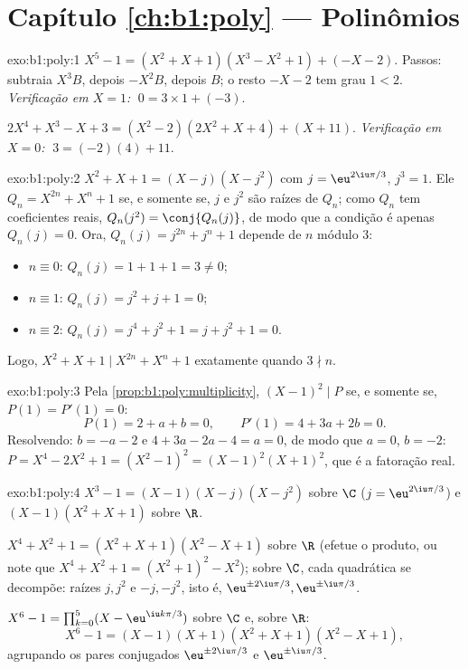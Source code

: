 \section*{Capítulo \ref{ch:b1:poly} --- Polinômios}

\begin{solution}{exo:b1:poly:1}
$X^5 - 1 = (X^2 + X + 1)(X^3 - X^2 + 1) + (-X - 2)$. Passos: subtraia
$X^3 B$, depois $-X^2 B$, depois $B$; o resto $-X - 2$ tem grau
$1 < 2$. \emph{Verificação em $X = 1$:} $\;0 = 3 \times 1 + (-3)$.

$2X^4 + X^3 - X + 3 = (X^2 - 2)(2X^2 + X + 4) + (X + 11)$. \emph{Verificação
em $X = 0$:} $\;3 = (-2)(4) + 11$.
\end{solution}

\begin{solution}{exo:b1:poly:2}
$X^2 + X + 1 = (X - j)(X - j^2)$ com $j = \eu^{2\iu\pi/3}$, $j^3 =
1$. Ele  $Q_n = X^{2n} + X^n + 1$ se, e somente se, $j$ e $j^2$ são raízes de
$Q_n$; como $Q_n$ tem coeficientes reais, $Q_n(j^2) =
\conj{Q_n(j)}$, de modo que a condição é apenas $Q_n(j) = 0$. Ora, $Q_n(j) =
j^{2n} + j^n + 1$ depende de $n$ módulo $3$:
\begin{itemize}
  \item $n \equiv 0$: $Q_n(j) = 1 + 1 + 1 = 3 \neq 0$;
  \item $n \equiv 1$: $Q_n(j) = j^2 + j + 1 = 0$;
  \item $n \equiv 2$: $Q_n(j) = j^4 + j^2 + 1 = j + j^2 + 1 = 0$.
\end{itemize}
Logo, $X^2 + X + 1 \mid X^{2n} + X^n + 1$ exatamente quando $3 \nmid n$.
\end{solution}

\begin{solution}{exo:b1:poly:3}
Pela \cref{prop:b1:poly:multiplicity}, $(X-1)^2 \mid P$ se, e somente se, $P(1) =
P'(1) = 0$:
\[
P(1) = 2 + a + b = 0, \qquad P'(1) = 4 + 3a + 2b = 0 .
\]
Resolvendo: $b = -a - 2$ e $4 + 3a - 2a - 4 = a = 0$, de modo que $a = 0$, $b =
-2$: $P = X^4 - 2X^2 + 1 = (X^2 - 1)^2 = (X-1)^2 (X+1)^2$, que é
a fatoração real.
\end{solution}

\begin{solution}{exo:b1:poly:4}
$X^3 - 1 = (X - 1)(X - j)(X - j^2)$ sobre $\C$ ($j = \eu^{2\iu\pi/3}$)
e $(X - 1)(X^2 + X + 1)$ sobre $\R$.

$X^4 + X^2 + 1 = (X^2 + X + 1)(X^2 - X + 1)$ sobre $\R$ (efetue o produto,
ou note que $X^4 + X^2 + 1 = (X^2+1)^2 - X^2$); sobre $\C$, cada quadrática
se decompõe: raízes $j, j^2$ e $-j, -j^2$, isto é, $\eu^{\pm 2\iu\pi/3},
\eu^{\pm\iu\pi/3}$.

$X^6 - 1 = \prod_{k=0}^{5} (X - \eu^{\iu k\pi/3})$ sobre $\C$ e, sobre
$\R$:
\[
X^6 - 1 = (X-1)(X+1)(X^2 + X + 1)(X^2 - X + 1),
\]
agrupando os pares conjugados $\eu^{\pm 2\iu\pi/3}$ e $\eu^{\pm
\iu\pi/3}$.
\end{solution}

